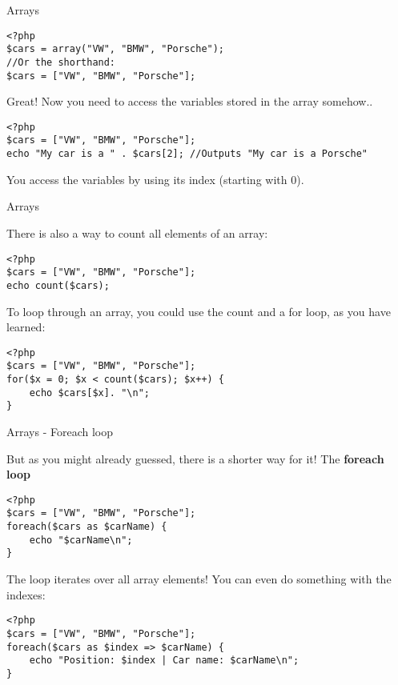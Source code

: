 \begin{frame}[fragile]{Arrays}

\begin{lstlisting}
<?php
$cars = array("VW", "BMW", "Porsche");
//Or the shorthand:
$cars = ["VW", "BMW", "Porsche"];
\end{lstlisting} \pause
Great! Now you need to access the variables stored in the array somehow.. \pause

\begin{lstlisting}
<?php
$cars = ["VW", "BMW", "Porsche"];
echo "My car is a " . $cars[2]; //Outputs "My car is a Porsche"
\end{lstlisting} \pause

You access the variables by using its index (starting with 0).

\end{frame}

\begin{frame}[fragile]{Arrays}

There is also a way to count all elements of an array: \pause

\begin{lstlisting}
<?php
$cars = ["VW", "BMW", "Porsche"];
echo count($cars);
\end{lstlisting} \pause

To loop through an array, you could use the count and a for loop, as you have learned: \pause

\begin{lstlisting}
<?php
$cars = ["VW", "BMW", "Porsche"];
for($x = 0; $x < count($cars); $x++) {
    echo $cars[$x]. "\n";
}
\end{lstlisting} \pause

\end{frame}

\begin{frame}[fragile]{Arrays - Foreach loop}

But as you might already guessed, there is a shorter way for it! The \textbf{foreach loop} \pause

\begin{lstlisting}
<?php
$cars = ["VW", "BMW", "Porsche"];
foreach($cars as $carName) {
    echo "$carName\n";
}
\end{lstlisting} \pause

The loop iterates over all array elements! You can even do something with the indexes: \pause

\begin{lstlisting}
<?php
$cars = ["VW", "BMW", "Porsche"];
foreach($cars as $index => $carName) {
    echo "Position: $index | Car name: $carName\n";
}
\end{lstlisting} \pause

\end{frame}

